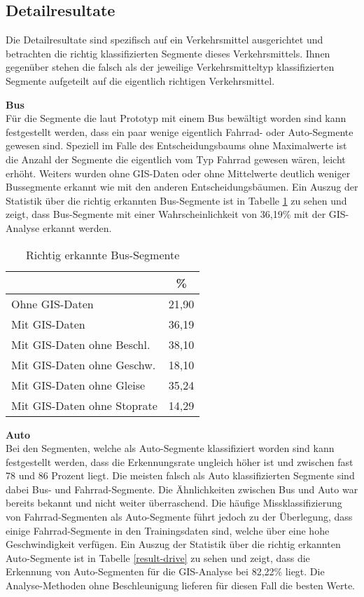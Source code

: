 \subsection{Detailresultate}
Die Detailresultate sind spezifisch auf ein Verkehrsmittel ausgerichtet und betrachten die richtig klassifizierten Segmente dieses Verkehrsmittels. Ihnen gegenüber stehen die falsch als der jeweilige Verkehrsmitteltyp klassifizierten Segmente aufgeteilt auf die eigentlich richtigen Verkehrsmittel.

\textbf{Bus} \\
Für die Segmente die laut Prototyp mit einem Bus bewältigt worden sind kann festgestellt werden, dass ein paar wenige eigentlich Fahrrad- oder Auto-Segmente gewesen sind. Speziell im Falle des Entscheidungsbaums ohne Maximalwerte ist die Anzahl der Segmente die eigentlich vom Typ Fahrrad gewesen wären, leicht erhöht. Weiters wurden ohne GIS-Daten oder ohne Mittelwerte deutlich weniger Bussegmente erkannt wie mit den anderen Entscheidungsbäumen. Ein Auszug der Statistik über die richtig erkannten Bus-Segmente ist in Tabelle \ref{result-bus} zu sehen und zeigt, dass Bus-Segmente mit einer Wahrscheinlichkeit von 36,19\% mit der GIS-Analyse erkannt werden.

\begin{table}[h]
\centering
\begin{tabular}{|l|c|}
\hline
 & \% \\ \hline
Ohne GIS-Daten & 21,90 \\ \hline
Mit GIS-Daten & 36,19 \\ \hline
Mit GIS-Daten ohne Beschl. & 38,10 \\ \hline
Mit GIS-Daten ohne Geschw. & 18,10 \\ \hline
Mit GIS-Daten ohne Gleise & 35,24 \\ \hline
Mit GIS-Daten ohne Stoprate & 14,29 \\ \hline
\end{tabular}
\caption{Richtig erkannte Bus-Segmente}
\label{result-bus}
\end{table}

\textbf{Auto} \\
Bei den Segmenten, welche als Auto-Segmente klassifiziert worden sind kann festgestellt werden, dass die Erkennungsrate ungleich höher ist und zwischen fast 78 und 86 Prozent liegt. Die meisten falsch als Auto klassifizierten Segmente sind dabei Bus- und Fahrrad-Segmente. Die Ähnlichkeiten zwischen Bus und Auto war bereits bekannt und nicht weiter überraschend. Die häufige Missklassifizierung von Fahrrad-Segmenten als Auto-Segmente führt jedoch zu der Überlegung, dass einige Fahrrad-Segmente in den Trainingsdaten sind, welche über eine hohe Geschwindigkeit verfügen. Ein Auszug der Statistik über die richtig erkannten Auto-Segmente ist in Tabelle \ref{result-drive} zu sehen und zeigt, dass die Erkennung von Auto-Segmenten für die GIS-Analyse bei 82,22\% liegt. Die Analyse-Methoden ohne Beschleunigung lieferen für diesen Fall die besten Werte.

